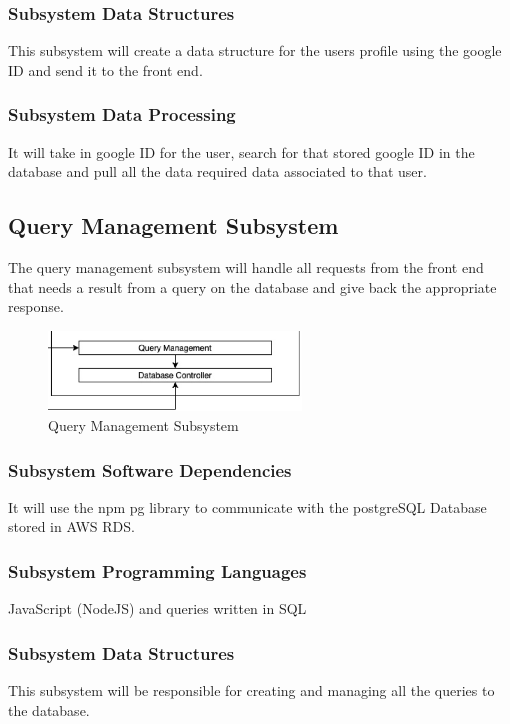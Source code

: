\subsubsection{Subsystem Data Structures}
This subsystem will create a data structure for the users profile using the google ID and send it to the front end.

\subsubsection{Subsystem Data Processing}
It will take in google ID for the user, search for that stored google ID in the database and pull all the data required data associated to that user.

\subsection{Query Management Subsystem}
The query management subsystem will handle all requests from the front end that needs a result from
a query on the database and give back the appropriate response.

\begin{figure}[h!]
	\centering
 	\includegraphics[width=0.60\textwidth]{images/Screenshot (61).png}
 \caption{Query Management Subsystem}
\end{figure}


\subsubsection{Subsystem Software Dependencies}
It will use the npm pg library to communicate with the postgreSQL Database stored in AWS RDS.

\subsubsection{Subsystem Programming Languages}
JavaScript (NodeJS) and queries written in SQL

\subsubsection{Subsystem Data Structures}
This subsystem will be responsible for creating and managing all the queries to the database.

